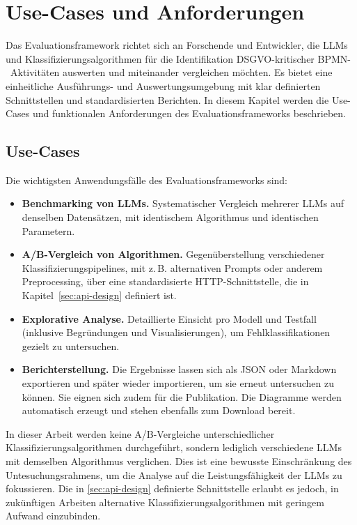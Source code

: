\section{Use-Cases und Anforderungen}\label{sec:anforderungen-und-use-cases}

Das Evaluationsframework richtet sich an Forschende und Entwickler, die \acp{LLM} und Klassifizierungsalgorithmen für die Identifikation \ac{DSGVO}-kritischer \ac{BPMN}-\linebreak~Aktivitäten auswerten und miteinander vergleichen möchten. Es bietet eine einheitliche Ausführungs- und Auswertungsumgebung mit klar definierten Schnittstellen und standardisierten Berichten. In diesem Kapitel werden die Use-Cases und funktionalen Anforderungen des Evaluationsframeworks beschrieben.

\subsection*{Use-Cases}

Die wichtigsten Anwendungsfälle des Evaluationsframeworks sind:

\begin{itemize}
    \item \textbf{Benchmarking von \acp{LLM}.} Systematischer Vergleich mehrerer \acp{LLM} auf denselben Datensätzen, mit identischem Algorithmus und identischen Parametern.
    \item \textbf{A/B-Vergleich von Algorithmen.} Gegenüberstellung verschiedener Klassifizierungspipelines, mit z.\,B. alternativen Prompts oder anderem Preprocessing, über eine standardisierte HTTP-Schnittstelle, die in Kapitel~\ref{sec:api-design} definiert ist.
    \item \textbf{Explorative Analyse.} Detaillierte Einsicht pro Modell und Testfall (inklusive Begründungen und Visualisierungen), um Fehlklassifikationen gezielt zu untersuchen.
    \item \textbf{Berichterstellung.} Die Ergebnisse lassen sich als JSON oder Markdown exportieren und später wieder importieren, um sie erneut untersuchen zu können. Sie eignen sich zudem für die Publikation. Die Diagramme werden automatisch erzeugt und stehen ebenfalls zum Download bereit.
\end{itemize}

In dieser Arbeit werden keine A/B-Vergleiche unterschiedlicher Klassifizierungsalgorithmen durchgeführt, sondern lediglich verschiedene \acp{LLM} mit demselben Algorithmus verglichen. Dies ist eine bewusste Einschränkung des Untesuchungsrahmens, um die Analyse auf die Leistungsfähigkeit der \acp{LLM} zu fokussieren. Die in \ref{sec:api-design} definierte Schnittstelle erlaubt es jedoch, in zukünftigen Arbeiten alternative Klassifizierungsalgorithmen mit geringem Aufwand einzubinden.

